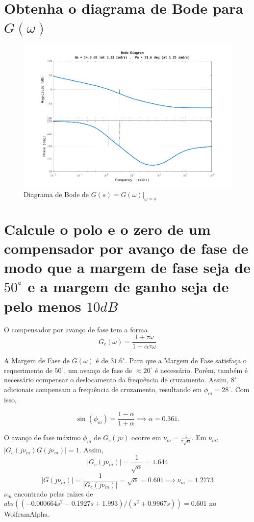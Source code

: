 \documentclass{article}
\begin{document}
\section{\normalsize{Obtenha o diagrama de Bode para $G(\omega)$}}
    \begin{figure}[H]
       \centering
            \includegraphics[width=1\linewidth]{images/bode_KG_w.png}
            \caption{Diagrama de Bode de $ G(s) = G(\omega)|_{\omega=s} $}
            \label{fig:bodeG}
    \end{figure}


\section{\normalsize{Calcule o polo e o zero de um compensador por avanço de fase de modo que a margem de fase seja de $50^{\circ}$ e a margem de ganho seja de pelo menos $10 dB$}}
    {O compensador por avanço de fase tem a forma}
    $$ G_c(\omega) = \frac{1 + \tau\omega}{1 + \alpha\tau\omega} $$

    {A Margem de Fase de $G (\omega) $ é de $ 31.6 ^{\circ} $. Para que a Margem de Fase satisfaça o requerimento de $ 50 ^{\circ} $, um avanço de fase de $ \approx 20 ^{\circ} $ é necessário. Porém, também é necessário compensar o deslocamento da frequência de cruzamento. Assim, $ 8 ^{\circ} $ adicionais compensam a frequência de cruzamento, resultando em $ \phi_m = 28 ^{\circ} $. Com isso,}

    $$ \sin(\phi_m) = \frac{ 1-\alpha }{ 1+\alpha } \implies \alpha = 0.361. $$

    {O avanço de fase máximo $\phi_m$ de $G_c(j\nu)$ ocorre em $\nu_m = \frac{1}{\tau \sqrt{\alpha}}$. Em $\nu_m$, $|G_c(j\nu_m)G(j\nu_m)| = 1$. Assim,}
    $$ |G_c(j\nu_m)| = \frac{1}{\sqrt{\alpha}} = 1.644 $$
    $$ |G(j\nu_m)| = \frac{1}{|G_c(j\nu_m)|} = \sqrt{\alpha} = 0.601 \implies \nu_m = 1.2773 $$
    {$\nu_m$ encontrado pelas raízes de $abs((-0.000664 s^2 - 0.1927 s + 1.993)/(s^2 + 0.9967 s)) = 0.601$ no WolframAlpha.}
\end{document}
